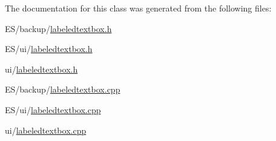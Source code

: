 The documentation for this class was generated from the following files:\begin{DoxyCompactItemize}
\item 
ES/backup/\hyperlink{_e_s_2backup_2labeledtextbox_8h}{labeledtextbox.h}\item 
ES/ui/\hyperlink{_e_s_2ui_2labeledtextbox_8h}{labeledtextbox.h}\item 
ui/\hyperlink{ui_2labeledtextbox_8h}{labeledtextbox.h}\item 
ES/backup/\hyperlink{_e_s_2backup_2labeledtextbox_8cpp}{labeledtextbox.cpp}\item 
ES/ui/\hyperlink{_e_s_2ui_2labeledtextbox_8cpp}{labeledtextbox.cpp}\item 
ui/\hyperlink{ui_2labeledtextbox_8cpp}{labeledtextbox.cpp}\end{DoxyCompactItemize}
